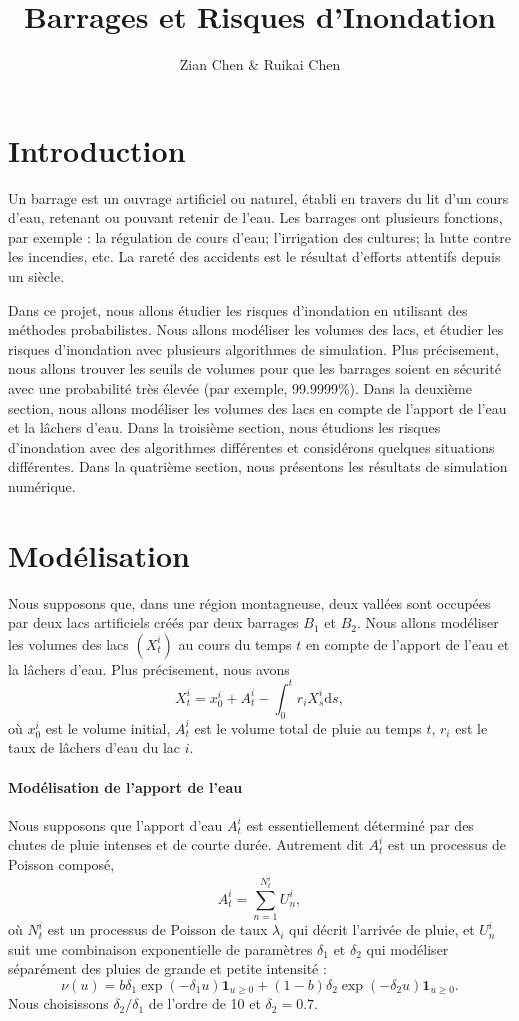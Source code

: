 \documentclass{article}
\title{Barrages et Risques d'Inondation}
\author{Zian Chen \& Ruikai Chen}
\def \dd {\mathrm{d}}
\begin{document}
\maketitle						%

\section{Introduction}
Un barrage est un ouvrage artificiel ou naturel, établi en travers du lit
d'un cours d'eau, retenant ou pouvant retenir de l'eau. Les barrages ont plusieurs fonctions, par exemple : la régulation de cours d'eau; l'irrigation des cultures; la lutte contre les incendies, etc. La rareté des accidents est le résultat d'efforts attentifs depuis un siècle.

Dans ce projet, nous allons étudier les risques d'inondation en utilisant des méthodes probabilistes. Nous allons modéliser les volumes des lacs, et étudier les risques d'inondation avec plusieurs algorithmes de simulation. Plus précisement, nous allons trouver les seuils de volumes pour que les barrages soient en sécurité avec une probabilité très élevée (par exemple, 99.9999\%). Dans la deuxième section, nous allons modéliser les volumes des lacs en compte de l'apport de l'eau et la lâchers d'eau. Dans la troisième section, nous étudions les risques d'inondation avec des algorithmes différentes et considérons quelques situations différentes. Dans la quatrième section, nous présentons les résultats de simulation numérique.
\section{Modélisation}
Nous supposons que, dans une région montagneuse, deux vallées
sont occupées par deux lacs artificiels créés par deux barrages $B_1$ et $B_2$. Nous allons modéliser les volumes des lacs $(X_t^i)$ au cours du temps $t$ en compte de l'apport de l'eau et la lâchers d'eau. Plus précisement, nous avons
\begin{equation}\label{eq_X}
  X_t^i = x_0^i + A_t^i - \int_0^t r_iX_s^i  \dd s,
\end{equation}
où $x_0^i$ est le volume initial, $A_t^i$ est le volume total de pluie au temps $t$, $r_i$ est le taux de lâchers d'eau du lac $i$.
\paragraph{Modélisation de l'apport de l'eau} Nous supposons que l'apport d'eau $A^i_t$ est essentiellement déterminé par des chutes de pluie intenses
et de courte durée. Autrement dit $A_t^i$ est un processus de Poisson composé,
\[A_t^i = \sum_{n=1}^{N_t^i} U_n^i,\]
où $N_t^i$ est un processus de Poisson de taux $\lambda_i$ qui décrit l'arrivée de pluie, et $U_n^i$ suit une combinaison exponentielle de paramètres $\delta_1$ et $\delta_2$ qui modéliser séparément des pluies de grande et petite intensité :
\[\nu(u) = b\delta_1\exp(-\delta_1 u)\mathbf{1}_{u\geq 0} + (1-b)\delta_2\exp(-\delta_2 u)\mathbf{1}_{u\geq 0}.\]
Nous choisissons $\delta_2/\delta_1$ de l'ordre de 10 et $\delta_2 = 0.7$.
\end{document}
